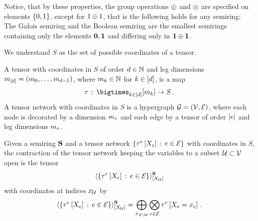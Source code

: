 Notice, that by these properties, the group operations $\oplus$ and $\otimes$ are specified on elements $\{0,1\}$, except for $1\oplus 1$, that is the following holds for any semiring:
The Galois semiring and the Boolean semiring are the smallest semirings containing only the elements $\mathbf{0},\mathbf{1}$ and differing only in $\mathbf{1}\oplus\mathbf{1}$.


We understand $S$ as the set of possible coordinates of a tensor.

\begin{definition}
    A tensor with coordinates in $S$ of order $d\in\mathbb{N}$ and leg dimensions $m_{[d]}=(m_{0},\ldots,m_{d-1})$, where $m_{k}\in\mathbb{N}$ for $k\in[d]$, is a map
    \begin{align*}
        \hypercore \defcols \facstates \rightarrow S \, .
    \end{align*}
    A tensor network with coordinates in $S$ is a hypergraph $\mathcal{G}=(\mathcal{V},\mathcal{E})$, where each node is decorated by a dimension $m_{v}$ and each edge by a tensor of order $\left|e\right|$ and leg dimensions $m_{e}$.
\end{definition}



\begin{definition}
    Given a semiring $\mathbf{S}$ and a tensor network $\left\{\tau^{e}\left[X_{e}\right]\,:\,e\in\mathcal{E}\right\}$ with coordinates in $S$, the contraction of the tensor network keeping the variables to a subset $\mathcal{U}\subset\mathcal{V}$ open is the tensor
    \begin{align*}
        \langle
            \left\{\tau^{e}\left[X_{e}\right]\,:\,e\in\mathcal{E}\right\}
        \rangle^{\mathbf{S}}_{[X_{\mathcal{U}}]}
    \end{align*}
    with coordinates at indices $x_{\mathcal{U}}$ by
    \begin{align*}
        \langle
            \left\{\tau^{e}\left[X_{e}\right]\,:\,e\in\mathcal{E}\right\}
        \rangle^{\mathbf{S}}_{[X_{\mathcal{U}}]}
        = \bigoplus_{x_{\mathcal{V}\backslash\mathcal{U}}} \bigotimes_{e\in\mathcal{E}} \tau^{e}\left[X_{e}=x_{e}\right] \, .
    \end{align*}
\end{definition}

